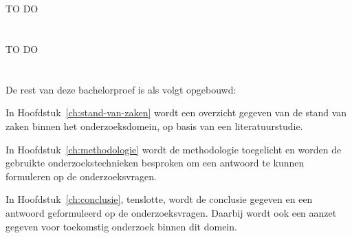 \section{}
\label{sec:onderzoeksvraag}

TO DO


\section{}
\label{sec:onderzoeksdoelstelling}

TO DO


\section{}
\label{sec:opzet-bachelorproef}


De rest van deze bachelorproef is als volgt opgebouwd:

In Hoofdstuk~\ref{ch:stand-van-zaken} wordt een overzicht gegeven van de stand van zaken binnen het onderzoeksdomein, op basis van een literatuurstudie.

In Hoofdstuk~\ref{ch:methodologie} wordt de methodologie toegelicht en worden de gebruikte onderzoekstechnieken besproken om een antwoord te kunnen formuleren op de onderzoeksvragen.


In Hoofdstuk~\ref{ch:conclusie}, tenslotte, wordt de conclusie gegeven en een antwoord geformuleerd op de onderzoeksvragen. Daarbij wordt ook een aanzet gegeven voor toekomstig onderzoek binnen dit domein.